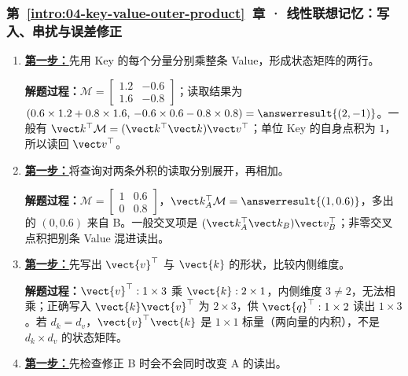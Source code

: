 \subsubsection*{第~\ref*{intro:04-key-value-outer-product}~章 · 线性联想记忆：写入、串扰与误差修正}
\begin{enumerate}[label={},leftmargin=4.8em,itemsep=4pt]
\item[\textbf{C-124.}] \leavevmode{}\label{solution:C-124}\label{solution:memory-single-write}\hyperref[exercise:memory-single-write]{\textbf{第一步：}}先用 Key 的每个分量分别乘整条 Value，形成状态矩阵的两行。\par\nobreak
\textbf{解题过程：}$\mathcal{M}=\begin{bmatrix}1.2&-0.6\\1.6&-0.8\end{bmatrix}$；读取结果为 $(0.6\times1.2+0.8\times1.6,\,-0.6\times0.6-0.8\times0.8)=\answerresult{(2,-1)}$。一般有 $\vect k^\top\mathcal{M}=(\vect k^\top\vect k)\vect v^\top$；单位 Key 的自身点积为 $1$，所以读回 $\vect v^\top$。
\item[\textbf{C-125.}] \leavevmode{}\label{solution:C-125}\label{solution:memory-cross-talk}\hyperref[exercise:memory-cross-talk]{\textbf{第一步：}}将查询对两条外积的读取分别展开，再相加。\par\nobreak
\textbf{解题过程：}$\mathcal{M}=\begin{bmatrix}1&0.6\\0&0.8\end{bmatrix}$，$\vect k_A^\top\mathcal{M}=\answerresult{(1,0.6)}$，多出的 $(0,0.6)$ 来自 B。一般交叉项是 $(\vect k_A^\top\vect k_B)\vect v_B^\top$；非零交叉点积把别条 Value 混进读出。
\item[\textbf{C-126.}] \leavevmode{}\label{solution:C-126}\label{solution:memory-outer-shape}\hyperref[exercise:memory-outer-shape]{\textbf{第一步：}}先写出 $\vect{v}^\top$ 与 $\vect{k}$ 的形状，比较内侧维度。\par\nobreak
\textbf{解题过程：}$\vect{v}^\top:1\times3$ 乘 $\vect{k}:2\times1$，内侧维度 $3\neq2$，无法相乘；正确写入 $\vect{k} \vect{v}^\top$ 为 $2\times3$，供 $\vect{q}^\top:1\times2$ 读出 $1\times3$。若 $d_k=d_v$，$\vect{v}^\top\vect{k}$ 是 $1\times1$ 标量（两向量的内积），不是 $d_k\times d_v$ 的状态矩阵。
\item[\textbf{C-127.}] \leavevmode{}\label{solution:C-127}\label{solution:memory-write-strategies}\hyperref[exercise:memory-write-strategies]{\textbf{第一步：}}先检查修正 B 时会不会同时改变 A 的读出。\par\nobreak

\end{enumerate}
